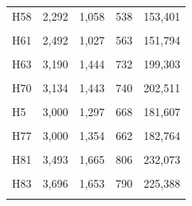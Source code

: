 \documentclass[
  a4paper,
  titlepage]{article}
\begin{document}
\begin{longtable}[t]{lllll}
H58 & 2,292 & 1,058 & 538 & 153,401\\
 
\cellcolor{gray!6}{H59} & \cellcolor{gray!6}{2,126} & \cellcolor{gray!6}{941} & \cellcolor{gray!6}{527} & \cellcolor{gray!6}{158,764}\\
 
H61 & 2,492 & 1,027 & 563 & 151,794\\
 
\cellcolor{gray!6}{H62} & \cellcolor{gray!6}{1,818} & \cellcolor{gray!6}{887} & \cellcolor{gray!6}{535} & \cellcolor{gray!6}{161,018}\\
 
H63 & 3,190 & 1,444 & 732 & 199,303\\
 
\cellcolor{gray!6}{H64} & \cellcolor{gray!6}{2,360} & \cellcolor{gray!6}{1,068} & \cellcolor{gray!6}{573} & \cellcolor{gray!6}{149,948}\\
 
H70 & 3,134 & 1,443 & 740 & 202,511\\
 
\cellcolor{gray!6}{H74} & \cellcolor{gray!6}{1,332} & \cellcolor{gray!6}{680} & \cellcolor{gray!6}{420} & \cellcolor{gray!6}{130,817}\\
 
H5 & 3,000 & 1,297 & 668 & 181,607\\
 
\cellcolor{gray!6}{H76} & \cellcolor{gray!6}{2,610} & \cellcolor{gray!6}{1,151} & \cellcolor{gray!6}{610} & \cellcolor{gray!6}{163,140}\\
 
H77 & 3,000 & 1,354 & 662 & 182,764\\
 
\cellcolor{gray!6}{H80} & \cellcolor{gray!6}{1,841} & \cellcolor{gray!6}{840} & \cellcolor{gray!6}{509} & \cellcolor{gray!6}{134,983}\\
 
H81 & 3,493 & 1,665 & 806 & 232,073\\
 
\cellcolor{gray!6}{H82} & \cellcolor{gray!6}{1,452} & \cellcolor{gray!6}{663} & \cellcolor{gray!6}{462} & \cellcolor{gray!6}{137,132}\\
 
H83 & 3,696 & 1,653 & 790 & 225,388\\
 
\cellcolor{gray!6}{H84} & \cellcolor{gray!6}{1,463} & \cellcolor{gray!6}{724} & \cellcolor{gray!6}{483} & \cellcolor{gray!6}{147,871}\\
 

\end{longtable}
\end{document}
